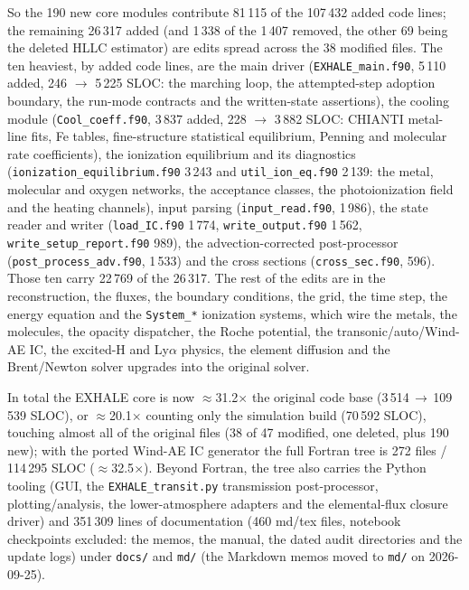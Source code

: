 \noindent
So the 190 new core modules contribute 81\,115 of the 107\,432 added code lines;
the remaining 26\,317 added (and 1\,338 of the 1\,407 removed, the other 69
being the deleted HLLC estimator) are edits spread across the 38 modified
files. The ten heaviest, by added code lines, are the main driver
(\texttt{EXHALE\_\allowbreak main.f90}, 5\,110 added, 246 $\to$ 5\,225 SLOC: the marching
loop, the attempted-step adoption boundary, the run-mode contracts and the
written-state assertions), the cooling module
(\texttt{Cool\_\allowbreak coeff.f90}, 3\,837 added, 228 $\to$ 3\,882 SLOC: CHIANTI
metal-line fits, Fe tables, fine-structure statistical equilibrium, Penning
and molecular rate coefficients), the ionization equilibrium and its diagnostics
(\texttt{ionization\_\allowbreak equilibrium.f90} 3\,243 and \texttt{util\_\allowbreak ion\_\allowbreak eq.f90}
2\,139: the metal, molecular and oxygen networks, the acceptance classes, the
photoionization field and the heating channels), input parsing
(\texttt{input\_\allowbreak read.f90}, 1\,986), the state reader and writer
(\texttt{load\_\allowbreak IC.f90} 1\,774, \texttt{write\_\allowbreak output.f90} 1\,562,
\texttt{write\_\allowbreak setup\_\allowbreak report.f90} 989), the advection-corrected post-processor
(\texttt{post\_\allowbreak process\_\allowbreak adv.f90}, 1\,533) and the cross sections
(\texttt{cross\_\allowbreak sec.f90}, 596). Those ten carry 22\,769 of the 26\,317. The rest
of the edits are in the reconstruction, the fluxes, the boundary conditions,
the grid, the time step, the energy equation and the \texttt{System\_*}
ionization systems, which wire the metals, the molecules, the opacity
dispatcher, the Roche potential, the transonic/auto/Wind-AE IC, the
excited-H and Ly$\alpha$ physics, the element diffusion and the Brent/Newton
solver upgrades into the original solver.

In total the EXHALE core is now $\approx$31.2$\times$ the original code base
(3\,514\,$\to$\,109\,539 SLOC), or $\approx$20.1$\times$ counting only the
simulation build (70\,592 SLOC), touching almost all of the original files (38
of 47 modified, one deleted, plus 190 new); with the ported Wind-AE IC
generator the full Fortran tree is 272 files / 114\,295 SLOC
($\approx$32.5$\times$). Beyond Fortran, the tree also carries the Python
tooling (GUI, the \texttt{EXHALE\_transit.py} transmission post-processor,
plotting/analysis, the lower-atmosphere adapters and the elemental-flux
closure driver) and 351\,309 lines of documentation (460 md/tex files, notebook
checkpoints excluded: the memos, the manual, the dated audit directories and
the update logs) under \texttt{docs/} and \texttt{md/} (the Markdown memos
moved to \texttt{md/} on 2026-09-25).


